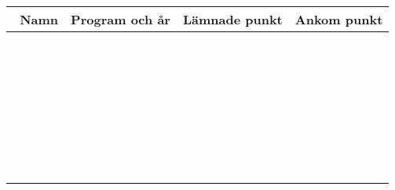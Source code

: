 \documentclass[10pt]{article}
\begin{document}
    \begin{table}[H]
    \begin{tabularx}{\textwidth}{|X|p{1.5cm}|p{1.5cm}|p{1.5cm}|}
        \hline
        {\ \newline Namn} & {Program och år} & {Lämnade punkt} & {Ankom punkt} \\ \hline
        &&&\\ \hline
        &&&\\ \hline
        &&&\\ \hline
        &&&\\ \hline
        &&&\\ \hline
        &&&\\ \hline
        &&&\\ \hline
        &&&\\ \hline
        &&&\\ \hline
        &&&\\ \hline
        &&&\\ \hline
        &&&\\ \hline
        &&&\\ \hline
        &&&\\ \hline
        &&&\\ \hline
        &&&\\ \hline
        &&&\\ \hline
        &&&\\ \hline
        &&&\\ \hline
        &&&\\ \hline
        &&&\\ \hline
        &&&\\ \hline
        &&&\\ \hline
        &&&\\ \hline
        &&&\\ \hline
        &&&\\ \hline
        &&&\\ \hline
        &&&\\ \hline
        &&&\\ \hline
        &&&\\ \hline
        &&&\\ \hline
        &&&\\ \hline
    \end{tabularx}
    \end{table}
\end{document}
